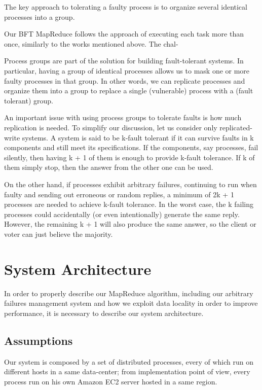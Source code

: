 \documentclass[sigchi]{acmart}
\begin{document}
The key approach to tolerating a faulty process is to organize several identical processes into a group. 


 Our BFT
MapReduce follows the approach of executing each task more
than once, similarly to the works mentioned above. The chal-



Process groups are part of the solution for building fault-tolerant systems.
In particular, having a group of identical processes allows us to mask one
or more faulty processes in that group. In other words, we can replicate
processes and organize them into a group to replace a single (vulnerable)
process with a (fault tolerant) group. 

An important issue with using process groups to tolerate faults is how
much replication is needed. To simplify our discussion, let us consider
only replicated-write systems. A system is said to be k-fault tolerant if it
can survive faults in k components and still meet its specifications. If the
components, say processes, fail silently, then having k + 1 of them is enough
to provide k-fault tolerance. If k of them simply stop, then the answer from
the other one can be used.

On the other hand, if processes exhibit arbitrary failures, continuing to
run when faulty and sending out erroneous or random replies, a minimum
of 2k + 1 processes are needed to achieve k-fault tolerance. In the worst case,
the k failing processes could accidentally (or even intentionally) generate the
same reply. However, the remaining k + 1 will also produce the same answer,
so the client or voter can just believe the majority.




\section{System Architecture}

In order to properly describe our MapReduce algorithm, including our arbitrary failures management system and how we exploit data locality in order to improve performance, it is necessary to describe our system architecture. 

\subsection{Assumptions}

Our system is composed by a set of distributed processes, every of which run on different hosts in a same data-center; from implementation point of view, every process run on his own Amazon EC2 server hosted in a same region.
\end{document}
